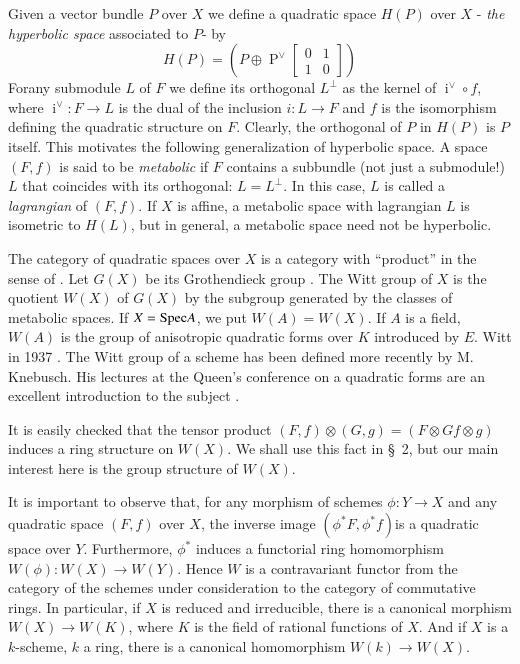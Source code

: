 Given a vector bundle $P$ over $X$ we define a quadratic space $H(P)$ over $X$ - \textit{the hyperbolic space}  associated to $P$- by 
$$
H(P)=\left(P\oplus \displaystyle\mathop{P}^{\vee}\begin{bmatrix}
0 & 1\\
1 & 0
\end{bmatrix}\right)
$$
For\pageoriginale any submodule $L$ of $F$ we define its orthogonal $L^{\perp}$ as the kernel of $\displaystyle\mathop{i}^{\vee}\circ f$, where $\displaystyle\mathop{i}^{\vee}:F\to L$ is the dual of the inclusion $i:L\to F$ and $f$ is the isomorphism defining the quadratic structure on $F$. Clearly, the orthogonal of $P$ in $H(P)$ is $P$ itself. This motivates the following generalization of hyperbolic space. A space $(F,f)$ is said to be \textit{metabolic} if $F$ contains a subbundle (not just a submodule!) $L$ that coincides with its orthogonal: $L=L^{\perp}$. In this case, $L$ is called a \textit{lagrangian} of $(F,f)$. If $X$ is affine, a metabolic space with lagrangian $L$ is isometric to $H(L)$, but in general, a metabolic space need not be hyperbolic. 

The category of quadratic spaces over $X$ is a category with ``product'' in the sense of \cite[p. 344]{key3}. Let $G(X)$ be its Grothendieck group \cite[p. 346]{key3}. The Witt group of $X$ is the quotient $W(X)$ of $G(X)$ by the subgroup generated by the classes of metabolic spaces. If $X=\mathrm{Spec} A$, we put $W(A)=W(X)$. If $A$ is a field, $W(A)$ is the group of anisotropic quadratic forms over $K$ introduced by $E$. Witt in 1937 \cite{key16}. The Witt group of a scheme has been defined more recently by M. Knebusch. His lectures at the Queen's conference on a quadratic forms are an excellent introduction to the subject \cite{key10}.

It is easily checked that the tensor product $(F,f)\otimes (G,g)=(F\otimes G f\otimes g)$ induces a ring structure on $W(X)$. We shall use this fact in \S\ 2, but our main interest here is the group structure of $W(X)$. 

It is important to observe that, for any morphism of schemes $\phi:Y\to X$ and any quadratic space $(F,f)$ over $X$, the inverse image $\left(\phi^{\ast}F, \phi^{\ast}f\right)$\pageoriginale is a quadratic space over $Y$. Furthermore, $\phi^{\ast}$ induces a functorial ring homomorphism $W(\phi):W(X)\to W(Y)$. Hence $W$ is a contravariant functor from the category of the schemes under consideration to the category of commutative rings. In particular, if $X$ is reduced and irreducible, there is a canonical morphism $W(X)\to W(K)$, where $K$ is the field of rational functions of $X$. And if $X$ is a $k$-scheme, $k$ a ring, there is a canonical homomorphism $W(k)\to W(X)$.

